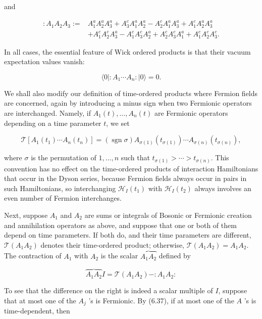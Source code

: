 \documentclass[10pt, letterpaper]{article}
\begin{document}
and

$$
\begin{aligned}
: A_{1} A_{2} A_{3}:= & A_{1}^{a} A_{2}^{a} A_{3}^{a}+A_{3}^{c} A_{1}^{a} A_{2}^{a}-A_{2}^{c} A_{1}^{a} A_{3}^{a}+A_{1}^{c} A_{2}^{a} A_{3}^{a} \\
& +A_{1}^{c} A_{2}^{c} A_{3}^{a}-A_{1}^{c} A_{3}^{c} A_{2}^{a}+A_{2}^{c} A_{3}^{c} A_{1}^{a}+A_{1}^{c} A_{2}^{c} A_{3}^{c} .
\end{aligned}
$$

In all cases, the essential feature of Wick ordered products is that their vacuum expectation values vanish:

$$
\langle 0|: A_{1} \cdots A_{n}:|0\rangle=0 .
$$

We shall also modify our definition of time-ordered products where Fermion fields are concerned, again by introducing a minus sign when two Fermionic operators are interchanged. Namely, if $A_{1}(t), \ldots, A_{n}(t)$ are Fermionic operators depending on a time parameter $t$, we set

$$
\mathcal{T}\left[A_{1}\left(t_{1}\right) \cdots A_{n}\left(t_{n}\right)\right]=(\operatorname{sgn} \sigma) A_{\sigma(1)}\left(t_{\sigma(1)}\right) \cdots A_{\sigma(n)}\left(t_{\sigma(n)}\right),
$$

where $\sigma$ is the permutation of $1, \ldots, n$ such that $t_{\sigma(1)}>\cdots>t_{\sigma(n)}$. This convention has no effect on the time-ordered products of interaction Hamiltonians that occur in the Dyson series, because Fermion fields always occur in pairs in such Hamiltonians, so interchanging $\mathcal{H}_{I}\left(t_{1}\right)$ with $\mathcal{H}_{I}\left(t_{2}\right)$ always involves an even number of Fermion interchanges.

Next, suppose $A_{1}$ and $A_{2}$ are sums or integrals of Bosonic or Fermionic creation and annihilation operators as above, and suppose that one or both of them depend on time parameters. If both do, and their time parameters are different, $\mathcal{T}\left(A_{1} A_{2}\right)$ denotes their time-ordered product; otherwise, $\mathcal{T}\left(A_{1} A_{2}\right)=A_{1} A_{2}$. The contraction of $A_{1}$ with $A_{2}$ is the scalar $\overbrace{A_{1} A_{2}}$ defined by

$$
\overbrace{A_{1} A_{2}} I=\mathcal{T}\left(A_{1} A_{2}\right)-: A_{1} A_{2}:
$$

To see that the difference on the right is indeed a scalar multiple of $I$, suppose that at most one of the $A_{j}$ 's is Fermionic. By (6.37), if at most one of the $A$ 's is time-dependent, then
\end{document}
